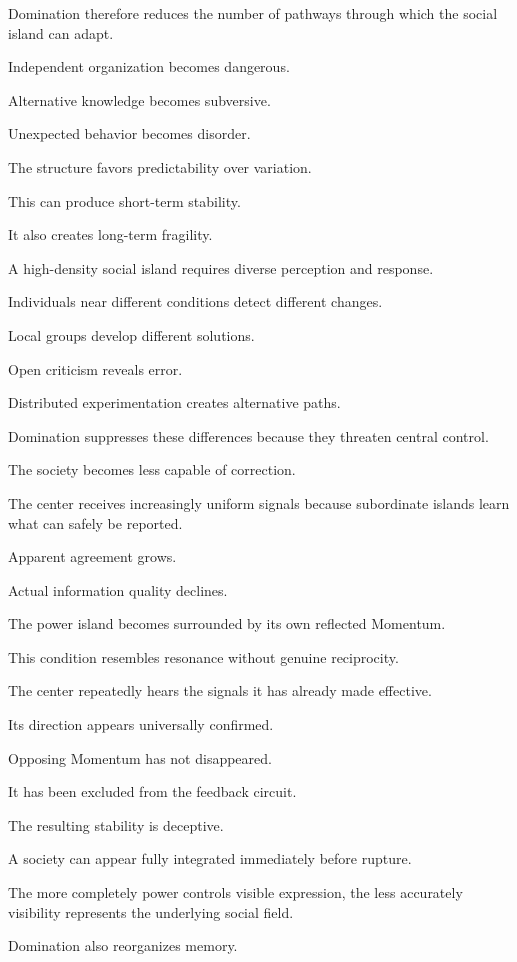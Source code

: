 Domination therefore reduces the number of pathways through which the social island can adapt.

Independent organization becomes dangerous.

Alternative knowledge becomes subversive.

Unexpected behavior becomes disorder.

The structure favors predictability over variation.

This can produce short-term stability.

It also creates long-term fragility.

A high-density social island requires diverse perception and response.

Individuals near different conditions detect different changes.

Local groups develop different solutions.

Open criticism reveals error.

Distributed experimentation creates alternative paths.

Domination suppresses these differences because they threaten central control.

The society becomes less capable of correction.

The center receives increasingly uniform signals because subordinate islands learn what can safely be reported.

Apparent agreement grows.

Actual information quality declines.

The power island becomes surrounded by its own reflected Momentum.

This condition resembles resonance without genuine reciprocity.

The center repeatedly hears the signals it has already made effective.

Its direction appears universally confirmed.

Opposing Momentum has not disappeared.

It has been excluded from the feedback circuit.

The resulting stability is deceptive.

A society can appear fully integrated immediately before rupture.

The more completely power controls visible expression, the less accurately visibility represents the underlying social field.

Domination also reorganizes memory.

